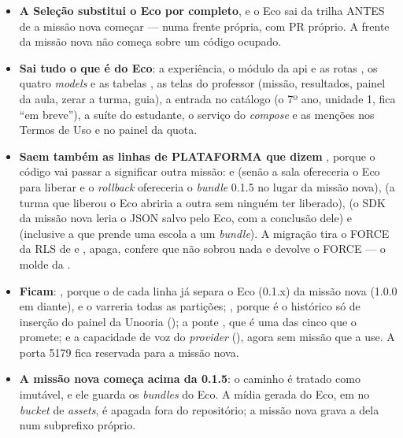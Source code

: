 \begin{itemize}
  \item \textbf{A Seleção substitui o Eco por completo}, e o Eco sai da trilha
    ANTES de a missão nova começar --- numa frente própria, com PR próprio. A
    frente da missão nova não começa sobre um código ocupado.
  \item \textbf{Sai tudo o que é do Eco}: a experiência, o módulo da api e as
    rotas , os quatro \emph{models} e as tabelas
    , as telas do professor (missão, resultados, painel da aula,
    zerar a turma, guia), a entrada no catálogo (o 7º ano, unidade 1, fica
    \enquote{em breve}), a suíte do estudante, o serviço do \emph{compose} e as
    menções nos Termos de Uso e no painel da quota.
  \item \textbf{Saem também as linhas de PLATAFORMA que dizem },
    porque o código vai passar a significar outra missão:  e
     (senão a sala ofereceria o Eco para liberar e o
    \emph{rollback} ofereceria o \emph{bundle} 0.1.5 no lugar da missão nova),
     (a turma que liberou o Eco abriria a outra sem ninguém ter
    liberado),  (o SDK da missão nova leria o JSON salvo pelo Eco,
    com a conclusão dele) e  (inclusive a
     que prende uma escola a um \emph{bundle}). A migração tira
    o FORCE da RLS de  e , apaga, confere que não
    sobrou nada e devolve o FORCE --- o molde da .
  \item \textbf{Ficam}: , porque o  de
    cada linha já separa o Eco (0.1.x) da missão nova (1.0.0 em diante), e o
     varreria todas as partições; , porque é o
    histórico só de inserção do painel da Unooria (); a ponte
    , que é uma das cinco que o  promete;
    e a capacidade de voz do \emph{provider} (), agora sem
    missão que a use. A porta 5179 fica reservada para a missão nova.
  \item \textbf{A missão nova começa acima da 0.1.5}: o caminho
     é tratado como imutável, e
    ele guarda os \emph{bundles} do Eco. A mídia gerada do Eco, em
     no \emph{bucket} de \emph{assets}, é apagada
    fora do repositório; a missão nova grava a dela num subprefixo próprio.
\end{itemize}

